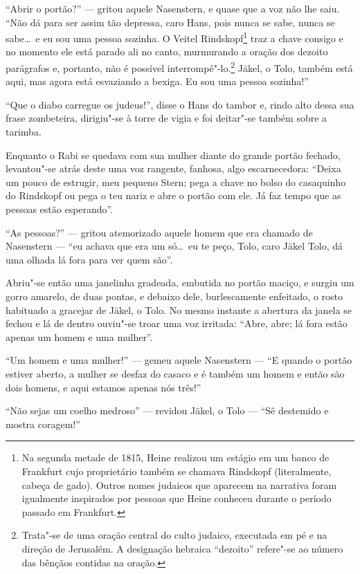``Abrir o portão?'' --- gritou aquele Nasenstern, e quase que a voz não lhe
saiu. ``Não dá para ser assim tão depressa, caro Hans, pois nunca se
sabe, nunca se sabe\ldots\ e eu sou uma pessoa sozinha. O Veitel
Rindskopf\footnote{ Na
segunda metade de 1815, Heine realizou um estágio em um banco de
Frankfurt cujo proprietário também se chamava Rindskopf (literalmente,
cabeça de gado). Outros nomes judaicos que aparecem na narrativa foram
igualmente inspirados por pessoas que Heine conheceu durante o período
passado em Frankfurt.}
 traz a chave consigo e no momento ele está parado ali no canto,
murmurando a oração dos dezoito parágrafos e, portanto, não é possível
interrompê"-lo.\footnote{
Trata"-se de uma oração central do culto judaico, executada em pé e na
direção de Jerusalém. A designação hebraica ``dezoito'' refere"-se ao
número das bênçãos contidas na oração.}
 Jäkel, o Tolo, também está aqui, mas agora está esvaziando a bexiga. Eu
sou uma pessoa sozinha!''

``Que o diabo carregue os judeus!'', disse o Hans do tambor e, rindo alto
dessa sua frase zombeteira, dirigiu"-se à torre de vigia e foi
deitar"-se também sobre a tarimba.

Enquanto o Rabi se quedava com sua mulher diante do grande portão
fechado, levantou"-se atrás deste uma voz rangente, fanhosa, algo
escarnecedora: ``Deixa um pouco de estrugir, meu pequeno Stern; pega a
chave no bolso do casaquinho do Rindskopf ou pega o teu nariz e abre o
portão com ele. Já faz tempo que as pessoas estão esperando''.

``As pessoas?'' --- gritou atemorizado aquele homem que era chamado de
Nasenstern --- ``eu achava que era um só\ldots\ eu te peço, Tolo, caro Jäkel
Tolo, dá uma olhada lá fora para ver quem são''.

Abriu"-se então uma janelinha gradeada, embutida no portão maciço, e
surgiu um gorro amarelo, de duas pontas, e debaixo dele, burlescamente
enfeitado, o rosto habituado a gracejar de Jäkel, o Tolo. No mesmo
instante a abertura da janela se fechou e lá de dentro ouviu"-se troar
uma voz irritada: ``Abre, abre; lá fora estão apenas um homem e uma
mulher''.

``Um homem e uma mulher!'' --- gemeu aquele Nasenstern --- ``E quando o portão
estiver aberto, a mulher se desfaz do casaco e é também um homem e
então são dois homens, e aqui estamos apenas nós três!''

``Não sejas um coelho medroso'' --- revidou Jäkel, o Tolo --- ``Sê destemido e
mostra coragem!''

